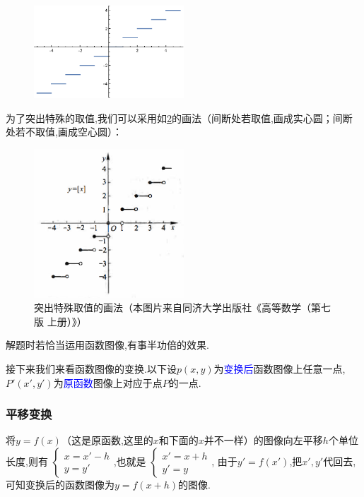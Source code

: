 \documentclass[lang=cn,math=cm,chinesefont=nofont,11pt,scheme=chinese,twocol]{elegantbook}
\begin{document}
\begin{figure}[h]
  \centering
  \includegraphics[width=0.5\textwidth]{image/2.1.5function5.eps}
  \label{img:2.1.5function5}
\end{figure}

为了突出特殊的取值,我们可以采用如\ref{img:2.1.5function6}的画法（间断处若取值,画成实心圆；间断处若不取值,画成空心圆）：

\begin{figure}[h]
  \centering
  \includegraphics[width=0.5\textwidth]{image/2.1.5function6.png}
  \caption{突出特殊取值的画法（本图片来自同济大学出版社《高等数学（第七版 上册）》）}
  \label{img:2.1.5function6}
\end{figure}

解题时若恰当运用函数图像,有事半功倍的效果.

接下来我们来看函数图像的变换.以下设$p(x,y)$为\textcolor{blue}{变换后}函数图像上任意一点,$P'(x',y')$为\textcolor{blue}{原函数}图像上对应于点$P$的一点.

\subsubsection{平移变换}

将$y=f(x)$（这是原函数,这里的$x$和下面的$x$并不一样）的图像向左平移$h$个单位长度,则有
$\begin{cases}
  x=x'-h
  \\y=y'
\end{cases}$,也就是
$\begin{cases}
  x'=x+h
  \\y'=y
\end{cases}$,
由于$y'=f(x')$,把$x',y'$代回去,可知变换后的函数图像为$y=f(x+h)$的图像.
\end{document}
